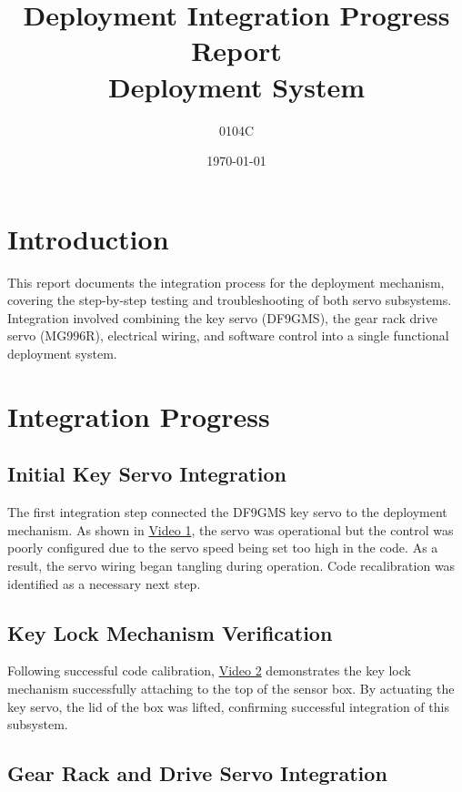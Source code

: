 \documentclass[12pt]{article}
\title{Deployment Integration Progress Report\\Deployment System}
\author{0104C}
\date{\today}
\begin{document}
\maketitle

\section{Introduction}

This report documents the integration process for the deployment mechanism, covering the step-by-step testing and troubleshooting of both servo subsystems. Integration involved combining the key servo (DF9GMS), the gear rack drive servo (MG996R), electrical wiring, and software control into a single functional deployment system.

\section{Integration Progress}

\subsection{Initial Key Servo Integration}

The first integration step connected the DF9GMS key servo to the deployment mechanism. As shown in \href{https://drive.google.com/file/d/1B9kVSxmLEpAjHLskNOtt1WgFnR0hwxYz/view?usp=drive_link}{Video 1}, the servo was operational but the control was poorly configured due to the servo speed being set too high in the code. As a result, the servo wiring began tangling during operation. Code recalibration was identified as a necessary next step.

\subsection{Key Lock Mechanism Verification}

Following successful code calibration, \href{https://drive.google.com/file/d/1NQgJGBopf075Fg2TIalUC3SOWtdoGTqC/view?usp=drive_link}{Video 2} demonstrates the key lock mechanism successfully attaching to the top of the sensor box. By actuating the key servo, the lid of the box was lifted, confirming successful integration of this subsystem.

\subsection{Gear Rack and Drive Servo Integration}
\end{document}
